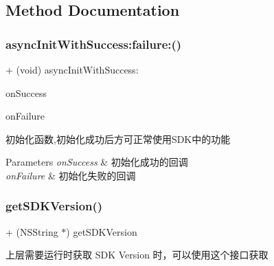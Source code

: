 \subsection{Method Documentation}
\mbox{\label{interface_alibc_trade_biz_s_d_k_aa20381d7b680ac54f8993683ec81aeb6}} 
\subsubsection{\texorpdfstring{async\+Init\+With\+Success\+:failure\+:()}{asyncInitWithSuccess:failure:()}}
{\footnotesize\ttfamily + (void) async\+Init\+With\+Success\+: \begin{DoxyParamCaption}\item[{(void($^\wedge$)())}]{on\+Success }\item[{failure:(void($^\wedge$)(N\+S\+Error $\ast$error))}]{on\+Failure }\end{DoxyParamCaption}}

初始化函数,初始化成功后方可正常使用\+S\+D\+K中的功能


\begin{DoxyParams}{Parameters}
{\em on\+Success} & 初始化成功的回调 \\
\hline
{\em on\+Failure} & 初始化失败的回调 \\
\hline
\end{DoxyParams}
\mbox{\label{interface_alibc_trade_biz_s_d_k_ade9e15def0980530603b5f9370de7725}} 
\subsubsection{\texorpdfstring{get\+S\+D\+K\+Version()}{getSDKVersion()}}
{\footnotesize\ttfamily + (N\+S\+String $\ast$) get\+S\+D\+K\+Version \begin{DoxyParamCaption}{ }\end{DoxyParamCaption}}

上层需要运行时获取 S\+DK Version 时，可以使用这个接口获取


